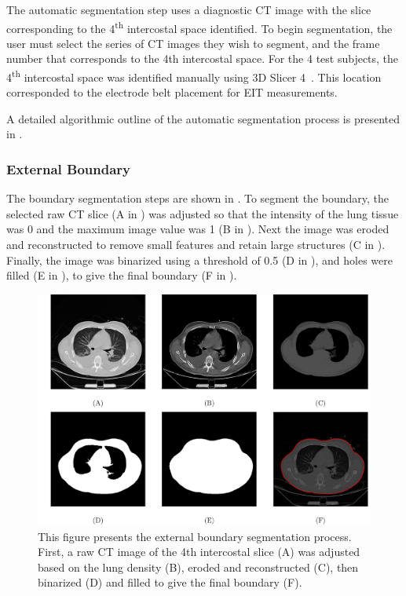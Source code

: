 The automatic segmentation step uses a diagnostic CT image 
with the slice corresponding to the 4\textsuperscript{th} intercostal space 
identified. 
To begin segmentation, the user must select the series of CT images they 
wish to segment, and the frame number that corresponds to the 4th intercostal 
space. For the 4 test subjects, the 4\textsuperscript{th} 
intercostal space was identified manually using
3D Slicer 4~\parencite{fedorov_3d_2012}. 
This location corresponded to the electrode belt placement for EIT measurements.

A detailed algorithmic outline of the automatic segmentation process is 
presented in .

\subsubsection{External Boundary} \label{sec:ext_seg}
The boundary segmentation steps are shown in .
To segment the boundary, the selected raw CT slice 
(A in ) 
was adjusted so that the
intensity of the lung tissue was 0 and the maximum image value was 1 
(B in ). 
Next the image was eroded and reconstructed 
to remove small features and retain large structures 
(C in ).
Finally, the image was binarized using a threshold of 0.5 (D in ),
and holes were filled (E in ), 
to give the final boundary (F in ).

\begin{figure}[H]
	\centering
	\includegraphics[width=\textwidth]{chapter5-CT_to_mesh/imgs/boundary_seg_methods.pdf}
	\caption[Boundary segmentation methods.]{\label{fig:ext_seg_methods}%
	This figure presents the external boundary segmentation process. First,
	a raw CT image of the 4th intercostal slice (A) 
	was adjusted based on the lung density (B), 
	eroded and reconstructed (C), then binarized (D) and 
	filled to give the final boundary (F).
	}
\end{figure}

